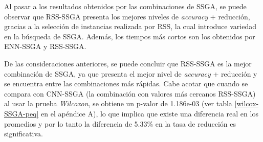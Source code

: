 




Al pasar a los resultados obtenidos por las combinaciones de SSGA, se puede observar que RSS-SSGA presenta los mejores niveles de \emph{accuracy} + reducción, gracias a la selección de instancias realizada por RSS, la cual introduce variedad en la búsqueda de SSGA. Además, los tiempos más cortos son los obtenidos por ENN-SSGA y RSS-SSGA. 

De las consideraciones anteriores, se puede concluir que RSS-SSGA es la mejor combinación de SSGA, ya que presenta el mejor nivel de \emph{accuracy} + reducción y se encuentra entre las combinaciones más rápidas. Cabe acotar que cuando se compara con CNN-SSGA (la combinación con valores más cercanos RSS-SSGA) al usar la prueba \emph{Wilcoxon}, se obtiene un p-valor de 1.186e-03 (ver tabla \ref{wilcox-SSGA-peq} en el apéndice A), lo que implica que existe una diferencia real en los promedios y por lo tanto la diferencia de 5.33\% en la tasa de reducción es significativa.

